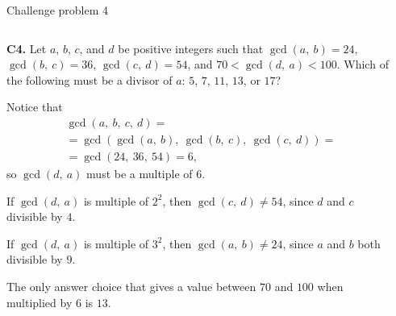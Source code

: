 \documentclass[9pt,aspectratio=169]{beamer}
\begin{document}
\begin{frame}{Challenge problem 4}
  \begin{columns}[T]
    \begin{column}{0.5\textwidth}
      \begin{problem}
        \textbf{C4.} Let $a$, $b$, $c$, and $d$ be positive integers such that $\gcd(a,\ b)=24$, $\gcd(b,\ c)=36$, $\gcd(c,\ d)=54$, and $70<\gcd(d,\ a)<100$. Which of the following must be a divisor of $a$: $5$, $7$, $11$, $13$, or $17$? 
      \end{problem}
      Notice that 
      \begin{multline*}
        \gcd (a,\ b,\ c,\ d)=\\
        =\gcd(\gcd(a,\ b),\ \gcd(b,\ c),\ \gcd(c,\ d))=\\
        =\gcd(24,\ 36,\ 54)=6, 
      \end{multline*}
      so $\gcd(d,\ a)$
      must be a multiple of $6$. 

      If $\gcd(d,\ a)$ is multiple of $2^2$, then $\gcd(c,\ d) \neq 54$, since $d$ and $c$ divisible by $4$.

      If $\gcd(d,\ a)$ is multiple of $3^2$, then $\gcd(a,\ b) \neq 24$, since $a$ and $b$ both divisible by $9$. 

      The only answer choice that gives a value between $70$ and $100$ when multiplied by $6$ is $\boxed{13}$. 
    \end{column}
    \begin{column}{0.5\textwidth}
    \end{column}
  \end{columns}
\end{frame}

\end{document}

